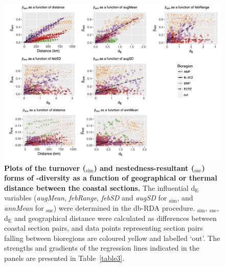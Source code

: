 \documentclass[utf8]{frontiersSCNS} %
\begin{document}
\begin{figure}[!ht]
\centering
\includegraphics[width=1.0\textwidth]{../figures/Fig5.jpg}
\caption{{\bf Plots of the turnover (\textbeta$_{\text{sim}}$) and nestedness-resultant (\textbeta$_{\text{sne}}$) forms of \textbeta-diversity as a function of geographical or thermal distance between the coastal sections.} The influential d$_{\text{E}}$ variables (\emph{augMean}, \emph{febRange}, \emph{febSD} and \emph{augSD} for \textbeta$_{\text{sim}}$, and \emph{annMean} for \textbeta$_{\text{sne}}$) were determined in the db-RDA procedure.  \textbeta$_{\text{sim}}$, \textbeta$_{\text{sne}}$, d$_{\text{E}}$ and geographical distance were calculated as differences between coastal section pairs, and data points representing section pairs falling between bioregions are coloured yellow and labelled `out'. The strengths and gradients of the regression lines indicated in the panels are presented in Table~\ref{table3}.}
\label{fig5}
\end{figure}



\end{document}
